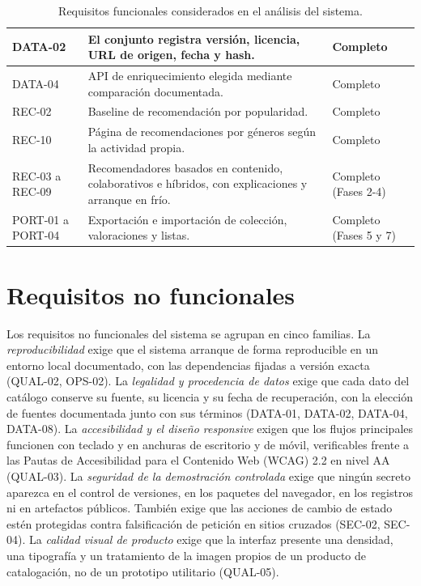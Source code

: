 \begin{table}[H]
\begin{tabularx}{\textwidth}{ | Y | Y | Z | }
    \hline
    DATA-02 & El conjunto registra versión, licencia, URL de origen, fecha y hash. & Completo \\
    \hline
    DATA-04 & API de enriquecimiento elegida mediante comparación documentada. & Completo \\
    \hline
    REC-02 & Baseline de recomendación por popularidad. & Completo \\
    \hline
    REC-10 & Página de recomendaciones por géneros según la actividad propia. & Completo \\
    \hline
    REC-03 a REC-09 & Recomendadores basados en contenido, colaborativos e híbridos, con explicaciones y arranque en frío. & Completo (Fases 2-4) \\
    \hline
    PORT-01 a PORT-04 & Exportación e importación de colección, valoraciones y listas. & Completo (Fases 5 y 7) \\
    \hline
\end{tabularx}
\caption{Requisitos funcionales considerados en el análisis del sistema.}
\label{tab:req-funcionales}
\end{table}

\section{Requisitos no funcionales}\label{sec:req-no-funcionales}

Los requisitos no funcionales del sistema se agrupan en cinco familias. La
\textit{reproducibilidad} exige que el sistema arranque de forma reproducible en un entorno
local documentado, con las dependencias fijadas a versión exacta (QUAL-02, OPS-02). La
\textit{legalidad y procedencia de datos} exige que cada dato del catálogo conserve su
fuente, su licencia y su fecha de recuperación, con la elección de fuentes documentada junto
con sus términos (DATA-01, DATA-02, DATA-04, DATA-08). La \textit{accesibilidad y el diseño
responsive} exigen que los flujos principales funcionen con teclado y en anchuras de
escritorio y de móvil, verificables frente a las Pautas de Accesibilidad para el Contenido
Web (WCAG) 2.2 en nivel AA~\cite{wcag22} (QUAL-03). La \textit{seguridad de la demostración
controlada} exige que ningún secreto aparezca en el control de versiones, en los paquetes del
navegador, en los registros ni en artefactos públicos. También exige que las acciones de
cambio de estado estén protegidas contra falsificación de petición en sitios cruzados
(SEC-02, SEC-04). La
\textit{calidad visual de producto} exige que la interfaz presente una densidad, una
tipografía y un tratamiento de la imagen propios de un producto de catalogación, no de un
prototipo utilitario (QUAL-05).

